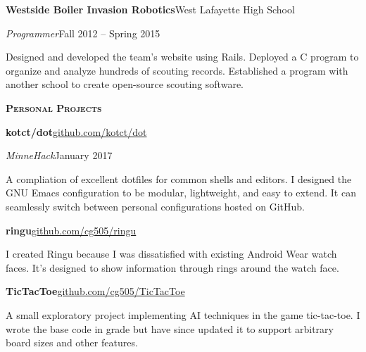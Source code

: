 \documentclass[11pt]{article}
\newcommand{\sectionfont}{\Large\scshape\bfseries\color{cg505green}}
\begin{document}
\begin{minipage}[t]{0.67\textwidth}
  \textbf{Westside Boiler Invasion Robotics}\hfill West Lafayette High School
  \begin{adjustwidth}{10pt}{}
    \emph{Programmer}\hfill Fall 2012 -- Spring 2015

    Designed and developed the team's website using Rails.
    Deployed a C program to organize and analyze hundreds of scouting records.
    Established a program with another school to create open-source scouting software.
  \end{adjustwidth}

  \vspace{5pt}

  {\sectionfont Personal Projects}

  \textbf{kotct/dot}\hfill\href{https://github.com/kotct/dot/}{github.com/kotct/dot}
  \begin{adjustwidth}{10pt}{}
    \emph{MinneHack}\hfill January 2017

    A compliation of excellent dotfiles for common shells and editors.
    I designed the GNU Emacs configuration to be modular, lightweight, and easy to extend.
    It can seamlessly switch between personal configurations hosted on GitHub.
  \end{adjustwidth}

  \textbf{ringu}\hfill\href{https://github.com/cg505/ringu/}{github.com/cg505/ringu}
  \begin{adjustwidth}{10pt}{}
    I created Ringu because I was dissatisfied with existing Android Wear watch faces.
    It's designed to show information through rings around the watch face.
  \end{adjustwidth}

  \textbf{TicTacToe}\hfill\href{https://github.com/cg505/TicTacToe/}{github.com/cg505/TicTacToe}
  \begin{adjustwidth}{10pt}{}
    A small exploratory project implementing AI techniques in the game tic-tac-toe.
    I wrote the base code in  grade but have since updated it to support arbitrary board sizes and other features.
  \end{adjustwidth}
\end{minipage}
\end{document}
